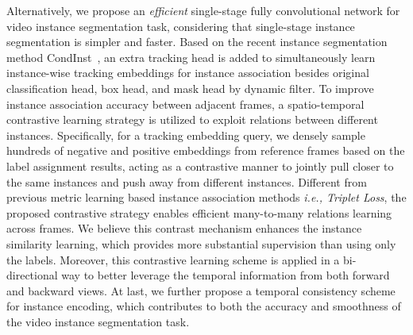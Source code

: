 \documentclass[runningheads]{llncs}
\begin{document}
Alternatively, we propose an \textit{efficient} single-stage fully convolutional network for video instance segmentation task, considering that single-stage instance segmentation is simpler and faster. Based on the recent instance segmentation method CondInst~\cite{tian2020conditional}, an extra tracking head is added to simultaneously learn instance-wise tracking embeddings for instance association besides original classification head, box head, and mask head by dynamic filter. To improve instance association accuracy between adjacent frames, a spatio-temporal contrastive learning strategy is utilized to exploit relations between different instances. Specifically, for a tracking embedding query, we densely sample hundreds of negative and positive embeddings from reference frames based on the label assignment results, acting as a contrastive manner to jointly pull closer to the same instances and push away from different instances. Different from previous metric learning based instance association methods {\em i.e., Triplet Loss}, the proposed contrastive strategy enables efficient many-to-many relations learning across frames. We believe this contrast mechanism enhances the instance similarity learning, which provides more substantial supervision than using only the labels. Moreover, this contrastive learning scheme is applied in a bi-directional way to better leverage the temporal information from both forward and backward views. At last, we further propose a temporal consistency scheme for instance encoding, which contributes to both the accuracy and smoothness of the video instance segmentation task. 
\end{document}
